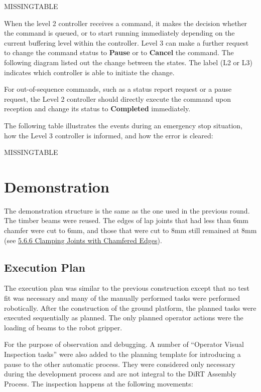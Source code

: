 MISSINGTABLE

When the level 2 controller receives a command, it makes the decision whether the command is queued, or to start running immediately depending on the current buffering level within the controller. Level 3 can make a further request to change the command status to \textbf{Pause }or to \textbf{Cancel }the command. The following diagram listed out the change between the states. The label (L2 or L3) indicates which controller is able to initiate the change. 

For out-of-sequence commands, such as a status report request or a pause request, the Level 2 controller should directly execute the command upon reception and change its status to \textbf{Completed }immediately.




The following table illustrates the events during an emergency stop situation, how the Level 3 controller is informed, and how the error is cleared:

MISSINGTABLE

\section{Demonstration}

The demonstration structure is the same as the one used in the previous round. The timber beams were reused. The edges of lap joints that had less than 6mm chamfer were cut to 6mm, and those that were cut to 8mm still remained at 8mm (see \ul{5.6.6 Clamping Joints with Chamfered Edges}). 

\subsection{Execution Plan}

The execution plan was similar to the previous construction except that no test fit was necessary and many of the manually performed tasks were performed robotically. After the construction of the ground platform, the planned tasks were executed sequentially as planned. The only planned operator actions were the loading of beams to the robot gripper. 

For the purpose of observation and debugging. A number of ``Operator Visual Inspection tasks'' were also added to the planning template for introducing a pause to the other automatic process. They were considered only necessary during the development process and are not integral to the DiRT Assembly Process. The inspection happens at the following movements:


